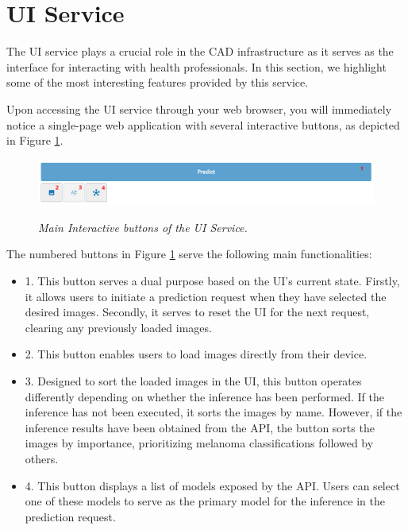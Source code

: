 \section{UI Service}

The UI service plays a crucial role in the CAD infrastructure as it serves as
the interface for interacting with health professionals. In this section, we
highlight some of the most interesting features provided by this service.

Upon accessing the UI service through your web browser, you will immediately
notice a single-page web application with several interactive buttons, as
depicted in Figure \ref{fig:ui-tools}.

\begin{figure}[H]
  \centering
  \includegraphics[width=\textwidth]{imatges/results/ui-tools.png}
  \caption[Main Interactive buttons of the UI Service]{\textit{Main Interactive buttons of the UI Service. }}
  {\label{fig:ui-tools}}
\end{figure}

The numbered buttons in Figure \ref{fig:ui-tools} serve the following
main functionalities:

\begin{itemize}
  \item 1. This button serves a dual purpose based on the UI's current state. Firstly, it allows users to initiate a prediction request when they have selected the desired images. Secondly, it serves to reset the UI for the next request, clearing any previously loaded images.
  \item 2. This button enables users to load images directly from their device.
  \item 3. Designed to sort the loaded images in the UI, this button operates differently depending on whether the inference has been performed. If the inference has not been executed, it sorts the images by name. However, if the inference results have been obtained from the API, the button sorts the images by importance, prioritizing melanoma classifications followed by others.
  \item 4. This button displays a list of models exposed by the API. Users can select one of these models to serve as the primary model for the inference in the prediction request.
\end{itemize}


